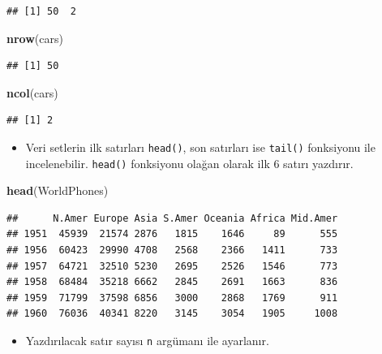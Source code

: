 \documentclass[
  oneside]{book}
\newenvironment{Shaded}{\begin{snugshade}}{\end{snugshade}}
\newcommand{\FunctionTok}[1]{\textcolor[rgb]{0.13,0.29,0.53}{\textbf{#1}}}
\newcommand{\NormalTok}[1]{#1}
\providecommand{\tightlist}{%
  \setlength{\itemsep}{0pt}\setlength{\parskip}{0pt}}
\begin{document}
\begin{verbatim}
## [1] 50  2
\end{verbatim}

\begin{Shaded}
\begin{Highlighting}[]
\FunctionTok{nrow}\NormalTok{(cars)}
\end{Highlighting}
\end{Shaded}

\begin{verbatim}
## [1] 50
\end{verbatim}

\begin{Shaded}
\begin{Highlighting}[]
\FunctionTok{ncol}\NormalTok{(cars)}
\end{Highlighting}
\end{Shaded}

\begin{verbatim}
## [1] 2
\end{verbatim}

\begin{itemize}
\tightlist
\item
  Veri setlerin ilk satırları \texttt{head()}, son satırları ise \texttt{tail()} fonksiyonu ile incelenebilir. \texttt{head()} fonksiyonu olağan olarak ilk 6 satırı yazdırır.
\end{itemize}

\begin{Shaded}
\begin{Highlighting}[]
\FunctionTok{head}\NormalTok{(WorldPhones)}
\end{Highlighting}
\end{Shaded}

\begin{verbatim}
##      N.Amer Europe Asia S.Amer Oceania Africa Mid.Amer
## 1951  45939  21574 2876   1815    1646     89      555
## 1956  60423  29990 4708   2568    2366   1411      733
## 1957  64721  32510 5230   2695    2526   1546      773
## 1958  68484  35218 6662   2845    2691   1663      836
## 1959  71799  37598 6856   3000    2868   1769      911
## 1960  76036  40341 8220   3145    3054   1905     1008
\end{verbatim}

\begin{itemize}
\tightlist
\item
  Yazdırılacak satır sayısı \texttt{n} argümanı ile ayarlanır.
\end{itemize}
\end{document}
